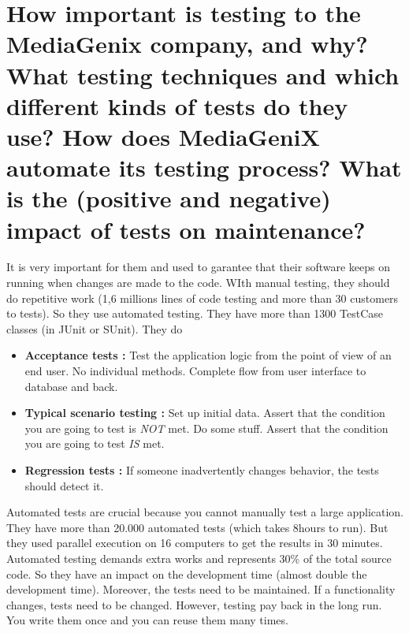 \section{How important is testing to the MediaGenix company, and why?
What testing techniques and which different kinds of tests do they use?
How does MediaGeniX automate its testing process?
What is the (positive and negative) impact of tests on maintenance?}

It is very important for them and used to garantee that their software keeps on running when changes are made to the code. 
WIth manual testing, they should do repetitive work (1,6 millions lines of code testing and more than 30 customers to tests). So they use automated testing. They have more than 1300 TestCase classes (in JUnit or SUnit).
They do 
\begin{itemize}
\item \textbf{Acceptance tests : } Test the application logic from the point of view of an end user. No individual methods. Complete flow from user interface to database and back.
\item \textbf{Typical scenario testing : } Set up initial data. Assert that the condition you are going to test is \emph{NOT} met. Do some stuff. Assert that the condition you are going to test \emph{IS} met.
\item \textbf{Regression tests : } If someone inadvertently changes behavior, the tests should detect it.
\end{itemize}
Automated tests are crucial because you cannot manually test a large application. They have more than 20.000 automated tests (which takes 8hours to run). But they used parallel execution on 16 computers to get the results in 30 minutes.
Automated testing demands extra works and represents 30\% of the total source code. So they have an impact on the development time (almost double the development time). Moreover, the tests need to be maintained. If a functionality changes, tests need to be changed.
However, testing pay back in the long run. You write them once and you can reuse them many times.

